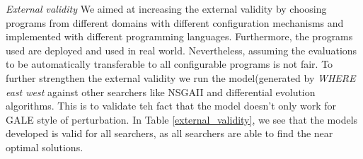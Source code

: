 \documentclass{sig-alternative}
\begin{document}
{\em External validity}  We aimed at increasing the external validity by choosing programs from different domains with different configuration mechanisms and implemented with different programming languages. Furthermore, the programs used are deployed and used in real world. Nevertheless, assuming the evaluations to be automatically transferable  to all configurable programs is not fair. To further strengthen the external validity we run the model(generated by \textit{WHERE east west} against other searchers like NSGAII and differential evolution algorithms\cite{storn1997differential}. This is to validate teh fact that the model doesn't only work for GALE style of perturbation. In Table \ref{external_validity}, we see that the models developed is valid for all searchers, as all searchers are able to find the near optimal solutions.
\end{document}
